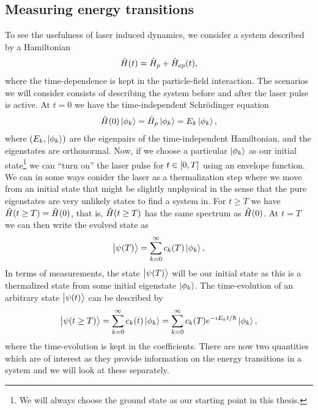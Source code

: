         \subsection{Measuring energy transitions}
            To see the usefulness of laser induced dynamics, we consider a
            system described by a Hamiltonian
            \begin{align}
                \hat{H}(t)
                = \hat{H}_p + \hat{H}_{ep}(t),
            \end{align}
            where the time-dependence is kept in the particle-field interaction.
            The scenarios we will consider consists of describing the system
            before and after the laser pulse is active.
            At $t = 0$ we have the time-independent Schrödinger equation
            \begin{align}
                \hat{H}(0)\ket{\phi_k}
                = \hat{H}_p\ket{\phi_k}
                = E_k\ket{\phi_k},
            \end{align}
            where $(E_k, \ket{\phi_k})$ are the eigenpairs of the
            time-independent Hamiltonian, and the eigenstates are orthonormal.
            Now, if we choose a particular $\ket{\phi_k}$ as our initial
            state\footnote{%
                We will always choose the ground state as our starting point in
                this thesis.
            } we can ``turn on'' the laser pulse for $t \in \left[ 0, T \right]$ using
            an envelope function.
            We can in some ways conider the laser as a thermalization step where
            we move from an initial state that might be slightly unphysical in
            the sense that the pure eigenstates are very unlikely states to find
            a system in.
            For $t \geq T$ we have $\hat{H}(t \geq T) = \hat{H}(0)$, that is,
            $\hat{H}(t \geq T)$ has the same spectrum as $\hat{H}(0)$.
            At $t = T$ we can then write the evolved state as
            \begin{align}
                \ket{\psi(T)} = \sum_{k = 0}^{\infty}
                c_k(T) \ket{\phi_k},
            \end{align}
            In terms of measurements, the state $\ket{\psi(T)}$ will be our
            initial state as this is a thermalized state from some initial
            eigenstate $\ket{\phi_k}$.
            The time-evolution of an arbitrary state $\ket{\psi(t)}$ can be
            described by
            \begin{align}
                \ket{\psi(t \geq T)}
                = \sum_{k = 0}^{\infty} c_k(t)\ket{\phi_k}
                = \sum_{k = 0}^{\infty}
                c_k(T) e^{-iE_k t/\hslash}\ket{\phi_k},
            \end{align}
            where the time-evolution is kept in the coefficients.
            There are now two quantities which are of interest as they provide
            information on the energy transitions in a system and we will look
            at these separately.


